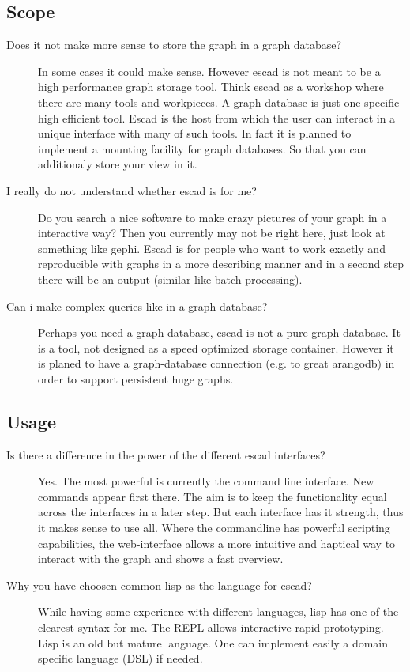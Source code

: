 \documentclass[a4paper, 12pt, openany]{scrbook}
\begin{document}
\subsection{Scope}
\begin{description}
\item[Does it not make more sense to store the graph in a graph database?] In some cases it could make sense. However escad is not meant to be a high performance graph storage tool. Think escad as a workshop where there are many tools and workpieces. A graph database is just one specific high efficient tool. Escad is the host from which the user can interact in a unique interface with many of such tools. In fact it is planned to implement a mounting facility for graph databases. So that you can additionaly store your view in it.
\item[I really do not understand whether escad is for me?] Do you search a nice software to make crazy pictures of your graph in a interactive way? Then you currently may not be right here, just look at something like gephi. Escad is for people who want to work exactly and reproducible with graphs in a more describing manner and in a second step there will be an output (similar like batch processing).
\item[Can i make complex queries like in a graph database?] Perhaps you need a graph database, escad is not a pure graph database. It is a tool, not designed as a speed optimized storage container. However it is planed to have a graph-database connection (e.g. to great arangodb) in order to support persistent huge graphs.
\end{description}
\subsection{Usage}
\begin{description}
\item[Is there a difference in the power of the different escad interfaces?] Yes. The most powerful is currently the command line interface. New commands appear first there. The aim is to keep the functionality equal across the interfaces in a later step. But each interface has it strength, thus it makes sense to use all. Where the commandline has powerful scripting capabilities, the web-interface allows a more intuitive and haptical way to interact with the graph and shows a fast overview.
\item[Why you have choosen common-lisp as the language for escad?] While having some experience with different languages, lisp has one of the clearest syntax for me. The REPL allows interactive rapid prototyping. Lisp is an old but mature language. One can implement easily a domain specific language (DSL) if needed.
\end{description}
\end{document}
